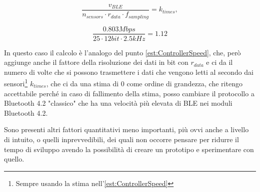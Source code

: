 \documentclass[a4paper, 10pt, final]{article} %
\begin{document}
\begin{enumerate}[label=\emph{(\arabic*)}]
            \begin{figure}[H]
                \centering
                \begin{minipage}[b]{.35\linewidth}
                    \centering
                    \[
                        \frac{v_{BLE}}{n_{sensors} \cdot r_{data} \cdot f_{sampling}} = k_{times} \mathrm{,}
                    \]
                \end{minipage}
                \begin{minipage}[b]{.35\linewidth}
                    \centering
                    \[
                        \frac{0.803Mbps}{25 \cdot 12bit \cdot 2.5kHz} = 1.12
                    \]
                \end{minipage}
            \end{figure}
            \noindent In questo caso il calcolo \`{e} l'analogo del punto \ref{est:ControllerSpeed}, che, per\`{o} aggiunge anche il fattore della risoluzione dei dati in bit con $r_{data}$ e ci da il numero di volte che si possono trasmettere i dati che vengono letti al secondo dai sensori\footnote{Sempre usando la stima nell'\ref{est:ControllerSpeed}} $k_{times}$, che ci da una stima di $0$ come ordine di grandezza, che ritengo accettabile perch\'{e} in caso di fallimento della stima, posso cambiare il protocollo a Bluetooth 4.2 "classico" che ha una velocit\`{a} pi\`{u} elevata di BLE nei moduli Bluetooth 4.2.
    \end{enumerate}
    \noindent Sono presenti altri fattori quantitativi meno importanti, pi\`{u} ovvi anche a livello di intuito, o quelli inprevvedibili, dei quali non occorre pensare per ridurre il tempo di sviluppo avendo la possibilit\`{a} di creare un prototipo e sperimentare con quello.
\end{document}
